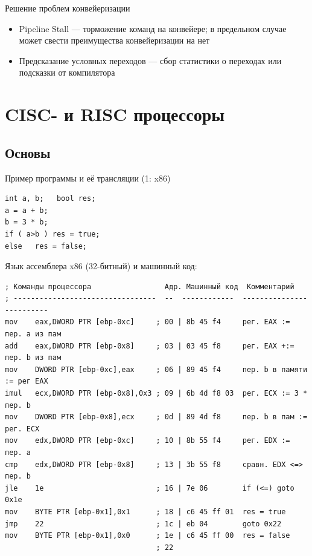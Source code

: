 \documentclass[xetex,aspectratio=43]{beamer}
\begin{document}
\begin{frame}{Решение проблем конвейеризации}
    \begin{itemize}
        \item Pipeline Stall — торможение команд на конвейере; в предельном случае может свести преимущества конвейеризации на нет
        \item Предсказание условных переходов — сбор статистики о переходах или подсказки от компилятора
    \end{itemize}
\end{frame}

\section{CISC- и RISC процессоры}

\subsection{Основы}

\begin{frame}[fragile]{Пример программы и её трансляции (1: x86)}
\footnotesize
\begin{verbatim}
int a, b;   bool res;
a = a + b;
b = 3 * b;
if ( a>b ) res = true;
else   res = false;
\end{verbatim}
Язык ассемблера x86 (32-битный) и машинный код:

\begin{verbatim}
; Команды процессора                 Адр. Машинный код  Комментарий
; ---------------------------------  --  ------------  -------------------------
mov    eax,DWORD PTR [ebp-0xc]     ; 00 | 8b 45 f4     рег. EAX := пер. a из пам
add    eax,DWORD PTR [ebp-0x8]     ; 03 | 03 45 f8     рег. EAX +:= пер. b из пам
mov    DWORD PTR [ebp-0xc],eax     ; 06 | 89 45 f4     пер. b в памяти := рег EAX
imul   ecx,DWORD PTR [ebp-0x8],0x3 ; 09 | 6b 4d f8 03  рег. ECX := 3 * пер. b
mov    DWORD PTR [ebp-0x8],ecx     ; 0d | 89 4d f8     пер. b в пам := рег. ECX
mov    edx,DWORD PTR [ebp-0xc]     ; 10 | 8b 55 f4     рег. EDX := пер. a
cmp    edx,DWORD PTR [ebp-0x8]     ; 13 | 3b 55 f8     сравн. EDX <=> пер. b
jle    1e                          ; 16 | 7e 06        if (<=) goto 0x1e
mov    BYTE PTR [ebp-0x1],0x1      ; 18 | c6 45 ff 01  res = true
jmp    22                          ; 1c | eb 04        goto 0x22
mov    BYTE PTR [ebp-0x1],0x0      ; 1e | c6 45 ff 00  res = false
                                   ; 22
\end{verbatim}
\end{frame}
\end{document}
